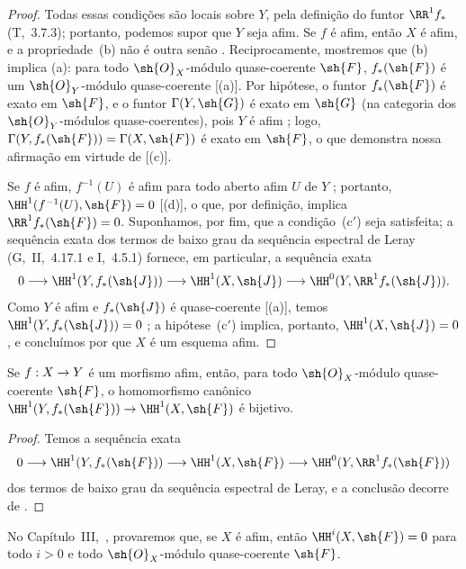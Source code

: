 \documentclass[oneside,10pt]{amsart}
\makeatletter
\newcommand{\ega@arrow}[2]{\mathchoice{#1}{#2}{#2}{#2}}
\renewcommand{\to}{\ega@arrow{\longrightarrow}{\rightarrow}}
\newcommand{\oldpage}[2][]{\marginnote{\normalfont\footnotesize\textbf{#1}~|~#2}\ignorespaces}
\let\EGAOriginalLabel\label
\renewcommand{\label}[1]{\phantomsection\EGAOriginalLabel{#1}}
\makeatother
\begin{document}
\begin{proof}
Todas essas condições são locais sobre $Y$, pela definição do funtor $\RR^1f_*$ (T,~3.7.3); portanto, podemos supor que $Y$ seja afim.
Se $f$ é afim, então $X$ é afim, e a propriedade~(b) não é outra senão .
Reciprocamente, mostremos que (b) implica (a):
para todo $\sh{O}_X$-módulo quase-coerente $\sh{F}$, $f_*(\sh{F})$ é um $\sh{O}_Y$-módulo quase-coerente [(a)].
Por hipótese, o funtor $f_*(\sh{F})$ é exato em $\sh{F}$, e o funtor $\Gamma(Y,\sh{G})$ é exato em $\sh{G}$ (na categoria dos $\sh{O}_Y$-módulos quase-coerentes), pois $Y$ é afim ;
logo, $\Gamma(Y,f_*(\sh{F}))=\Gamma(X,\sh{F})$ é exato em $\sh{F}$, o que demonstra nossa afirmação em virtude de [(c)].

Se $f$ é afim, $f^{-1}(U)$ é afim para todo aberto afim $U$ de $Y$ ; portanto, $\HH^1(f^{-1}(U),\sh{F})=0$ [(d)], o que, por definição, implica $\RR^1f_*(\sh{F})=0$.
Suponhamos, por fim, que a condição~(c$'$) seja satisfeita;
a sequência exata dos termos de baixo grau da sequência espectral de Leray (G,~II,~4.17.1 e I,~4.5.1) fornece, em particular, a sequência exata
\[
  0\to\HH^1(Y,f_*(\sh{J}))\to\HH^1(X,\sh{J})\to\HH^0(Y,\RR^1f_*(\sh{J})).
\]
Como $Y$ é afim e $f_*(\sh{J})$ é quase-coerente [(a)], temos $\HH^1(Y,f_*(\sh{J}))=0$ ;
a hipótese~(c$'$) implica, portanto, $\HH^1(X,\sh{J})=0$, e concluímos por  que $X$ é um esquema afim.
\end{proof}

\begin{corollary}[5.2.3]
\label{II.5.2.3}
Se $f:X\to Y$ é um morfismo afim, então, para todo $\sh{O}_X$-módulo quase-coerente $\sh{F}$, o homomorfismo canônico $\HH^1(Y,f_*(\sh{F}))\to\HH^1(X,\sh{F})$ é bijetivo.
\end{corollary}

\oldpage[II]{99}
\begin{proof}
Temos a sequência exata
\[
  0\to\HH^1(Y,f_*(\sh{F}))\to\HH^1(X,\sh{F})\to\HH^0(Y,\RR^1f_*(\sh{F}))
\]
dos termos de baixo grau da sequência espectral de Leray, e a conclusão decorre de .
\end{proof}

\begin{remark}[5.2.4]
\label{II.5.2.4}
No Capítulo~III,~, provaremos que, se $X$ é afim, então $\HH^i(X,\sh{F})=0$ para todo $i>0$ e todo $\sh{O}_X$-módulo quase-coerente $\sh{F}$.
\end{remark}
\end{document}
